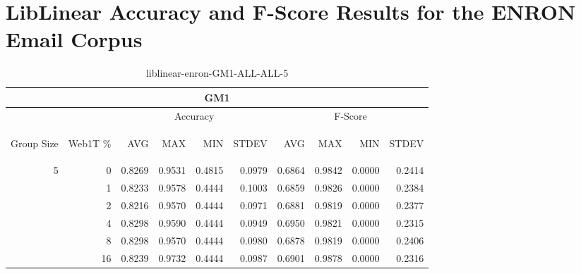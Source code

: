 \chapter{LibLinear Accuracy and F-Score Results for the ENRON Email Corpus}

\begin{center}
\begin{table}[htbp]
\begin{tabular}{ | r | r | r | r | r | r | r | r | r | r |}
\hline
\multicolumn{10}{|c|}{GM1}\\
\hline
 & & \multicolumn{4}{|c|}{Accuracy} & \multicolumn{4}{|c|}{F-Score}\\ \cline{3-10}
\begin{sideways}Group Size\end{sideways} & \begin{sideways}Web1T \%\end{sideways} & \begin{sideways}AVG\end{sideways} & \begin{sideways}MAX\end{sideways} & \begin{sideways}MIN\end{sideways} & \begin{sideways}STDEV\end{sideways} & \begin{sideways}AVG\end{sideways} & \begin{sideways}MAX\end{sideways} & \begin{sideways}MIN\end{sideways} & \begin{sideways}STDEV\end{sideways}\\
\hline
\multirow{5}{*}{5}
 & 0 & 0.8269 & 0.9531 & 0.4815 & 0.0979 & 0.6864 & 0.9842 & 0.0000 & 0.2414\\ \cline{2-10}
 & 1 & 0.8233 & 0.9578 & 0.4444 & 0.1003 & 0.6859 & 0.9826 & 0.0000 & 0.2384\\ \cline{2-10}
 & 2 & 0.8216 & 0.9570 & 0.4444 & 0.0971 & 0.6881 & 0.9819 & 0.0000 & 0.2377\\ \cline{2-10}
 & 4 & 0.8298 & 0.9590 & 0.4444 & 0.0949 & 0.6950 & 0.9821 & 0.0000 & 0.2315\\ \cline{2-10}
 & 8 & 0.8298 & 0.9570 & 0.4444 & 0.0980 & 0.6878 & 0.9819 & 0.0000 & 0.2406\\ \cline{2-10}
 & 16 & 0.8239 & 0.9732 & 0.4444 & 0.0987 & 0.6901 & 0.9878 & 0.0000 & 0.2316\\ \cline{2-10}
\hline
\end{tabular}
\caption{liblinear-enron-GM1-ALL-ALL-5}
\label{table:liblinear-enron-GM1-ALL-ALL-5}
\end{table}
\end{center}


